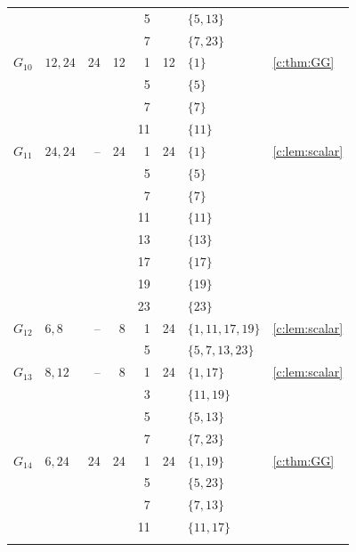 \documentclass[11pt]{amsart}
\theoremstyle{definition}
\begin{document}
\begin{longtable}{@{}lL{.24\textwidth}rrrrL{.26\textwidth}L{.14\textwidth}@{}}
 &  &  &  & 5 &  & $\{5,\allowbreak 13\}$ &  \\*
 &  &  &  & 7 &  & $\{7,\allowbreak 23\}$ &  \\
\midrule[.25pt]
$G_{10}$ & $12,\allowbreak 24$ & 24 & 12 & 1 & 12 & $\{1\}$ & \cref{c:thm:GG} \\*
 &  &  &  & 5 &  & $\{5\}$ &  \\*
 &  &  &  & 7 &  & $\{7\}$ &  \\*
 &  &  &  & 11 &  & $\{11\}$ &  \\
\midrule[.25pt]
$G_{11}$ & $24,\allowbreak 24$ & -- & 24 & 1 & 24 & $\{1\}$ & \cref{c:lem:scalar} \\*
 &  &  &  & 5 &  & $\{5\}$ &  \\*
 &  &  &  & 7 &  & $\{7\}$ &  \\*
 &  &  &  & 11 &  & $\{11\}$ &  \\*
 &  &  &  & 13 &  & $\{13\}$ &  \\*
 &  &  &  & 17 &  & $\{17\}$ &  \\*
 &  &  &  & 19 &  & $\{19\}$ &  \\*
 &  &  &  & 23 &  & $\{23\}$ &  \\
\midrule[.25pt]
$G_{12}$ & $6,\allowbreak 8$ & -- & 8 & 1 & 24 & $\{1,\allowbreak 11,\allowbreak 17,\allowbreak 19\}$ & \cref{c:lem:scalar} \\*
 &  &  &  & 5 &  & $\{5,\allowbreak 7,\allowbreak 13,\allowbreak 23\}$ &  \\
\midrule[.25pt]
$G_{13}$ & $8,\allowbreak 12$ & -- & 8 & 1 & 24 & $\{1,\allowbreak 17\}$ & \cref{c:lem:scalar} \\*
 &  &  &  & 3 &  & $\{11,\allowbreak 19\}$ &  \\*
 &  &  &  & 5 &  & $\{5,\allowbreak 13\}$ &  \\*
 &  &  &  & 7 &  & $\{7,\allowbreak 23\}$ &  \\
\midrule[.25pt]
$G_{14}$ & $6,\allowbreak 24$ & 24 & 24 & 1 & 24 & $\{1,\allowbreak 19\}$ & \cref{c:thm:GG} \\*
 &  &  &  & 5 &  & $\{5,\allowbreak 23\}$ &  \\*
 &  &  &  & 7 &  & $\{7,\allowbreak 13\}$ &  \\*
 &  &  &  & 11 &  & $\{11,\allowbreak 17\}$ &  \\
\midrule[.25pt]

\end{longtable}
\end{document}
